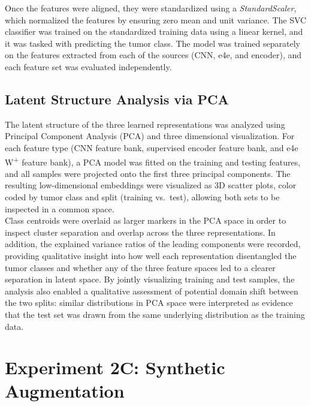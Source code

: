 Once the features were aligned, they were standardized using a \textit{StandardScaler}, which normalized the features by ensuring zero mean and unit variance. The SVC classifier was trained on the standardized training data using a linear kernel, and it was tasked with predicting the tumor class. The model was trained separately on the features extracted from each of the sources (CNN, e4e, and encoder), and each feature set was evaluated independently.



\subsection{Latent Structure Analysis via PCA}

The latent structure of the three learned representations was analyzed using Principal Component Analysis (PCA) and three dimensional visualization. For each feature type (CNN feature bank, supervised encoder feature bank, and e4e W\textsuperscript{+} feature bank), a PCA model was fitted on the training and testing features, and all samples were projected onto the first three principal components. The resulting low-dimensional embeddings were visualized as 3D scatter plots, color coded by tumor class and split (training vs.\ test), allowing both sets to be inspected in a common space.\\

Class centroids were overlaid as larger markers in the PCA space in order to inspect cluster separation and overlap across the three representations. In addition, the explained variance ratios of the leading components were recorded, providing qualitative insight into how well each representation disentangled the tumor classes and whether any of the three feature spaces led to a clearer separation in latent space. By jointly visualizing training and test samples, the analysis also enabled a qualitative assessment of potential domain shift between the two splits: similar distributions in PCA space were interpreted as evidence that the test set was drawn from the same underlying distribution as the training data.


\clearpage
\section{Experiment 2C: Synthetic Augmentation}

\label{sec:exp2c}


